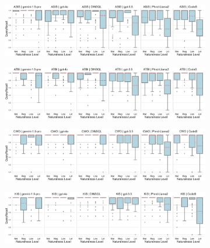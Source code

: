   \begin{figure}
    \centering
    \begin{subfigure}{\textwidth}
      \centering
      \includegraphics[width=\textwidth]{figures/natlevel-boxplots/natlevel-model-recall-boxplot-ASIS.pdf}
    \end{subfigure}
    \begin{subfigure}{\textwidth}
      \centering
      \includegraphics[width=\textwidth]{figures/natlevel-boxplots/natlevel-model-recall-boxplot-ATBI.pdf}
    \end{subfigure}
    \begin{subfigure}{\textwidth}
      \centering
      \includegraphics[width=\textwidth]{figures/natlevel-boxplots/natlevel-model-recall-boxplot-CWO.pdf}
    \end{subfigure}
    \begin{subfigure}{\textwidth}
      \centering
      \includegraphics[width=\textwidth]{figures/natlevel-boxplots/natlevel-model-recall-boxplot-KIS.pdf}
    \end{subfigure}
    \begin{subfigure}{\textwidth}

\end{subfigure}
\end{figure}
